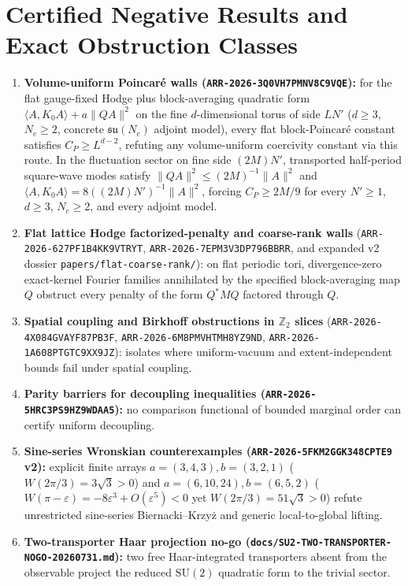 \documentclass[11pt]{article}
\newcommand{\Z}{\mathbb{Z}}
\begin{document}
\section{Certified Negative Results and Exact Obstruction Classes}

\begin{enumerate}
  \item \textbf{Volume-uniform Poincar\'e walls (\texttt{ARR-2026-3Q0VH7PMNV8C9VQE}):}
  for the flat gauge-fixed Hodge plus block-averaging quadratic form
  $\langle A, K_0 A\rangle + a\|QA\|^2$ on the fine $d$-dimensional torus of side $L N'$
  ($d \ge 3$, $N_c \ge 2$, concrete $\mathfrak{su}(N_c)$ adjoint model), every flat
  block-Poincar\'e constant satisfies $C_P \ge L^{d-2}$, refuting any volume-uniform
  coercivity constant via this route. In the fluctuation sector on fine side $(2M)N'$,
  transported half-period square-wave modes satisfy $\|QA\|^2 \le (2M)^{-1}\|A\|^2$ and
  $\langle A, K_0 A\rangle = 8((2M)N')^{-1}\|A\|^2$, forcing $C_P \ge 2M/9$ for every
  $N' \ge 1$, $d \ge 3$, $N_c \ge 2$, and every adjoint model.
  \item \textbf{Flat lattice Hodge factorized-penalty and coarse-rank walls}
  (\texttt{ARR-2026-627PF1B4KK9VTRYT}, \texttt{ARR-2026-7EPM3V3DP796BBRR}, and expanded
  v2 dossier \texttt{papers/flat-coarse-rank/}): on flat periodic tori, divergence-zero
  exact-kernel Fourier families annihilated by the specified block-averaging map $Q$
  obstruct every penalty of the form $Q^* M Q$ factored through $Q$.
  \item \textbf{Spatial coupling and Birkhoff obstructions in $\Z_2$ slices}
  (\texttt{ARR-2026-4X084GVAYF87PB3F}, \texttt{ARR-2026-6M8PMVHTMH8YZ9ND},
  \texttt{ARR-2026-1A608PTGTC9XX9JZ}): isolates where uniform-vacuum and extent-independent
  bounds fail under spatial coupling.
  \item \textbf{Parity barriers for decoupling inequalities (\texttt{ARR-2026-5HRC3PS9HZ9WDAA5}):}
  no comparison functional of bounded marginal order can certify uniform decoupling.
  \item \textbf{Sine-series Wronskian counterexamples (\texttt{ARR-2026-5FKM2GGK348CPTE9} v2):}
  explicit finite arrays $a=(3,4,3), b=(3,2,1)$ ($W(2\pi/3)=3\sqrt{3}>0$) and
  $a=(6,10,24), b=(6,5,2)$ ($W(\pi-\varepsilon) = -8\varepsilon^3+O(\varepsilon^5)<0$ yet
  $W(2\pi/3)=51\sqrt{3}>0$) refute unrestricted sine-series Biernacki--Krzy\.z and generic
  local-to-global lifting.
  \item \textbf{Two-transporter Haar projection no-go (\texttt{docs/SU2-TWO-TRANSPORTER-NOGO-20260731.md}):}
  two free Haar-integrated transporters absent from the observable project the reduced
  $\mathrm{SU}(2)$ quadratic form to the trivial sector.
\end{enumerate}
\end{document}
